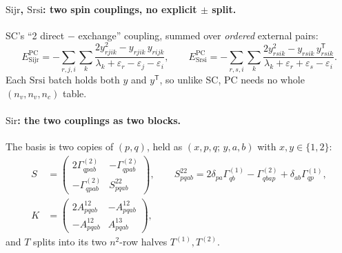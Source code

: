 \documentclass[11pt]{article}
\newcommand{\G}[1]{\Gamma^{(#1)}}
\newcommand{\eps}{\varepsilon}
\newcommand{\cls}[1]{\ensuremath{\mathrm{#1}}}
\begin{document}
\paragraph{\cls{Sijr}, \cls{Srsi}: two spin couplings, no explicit $\pm$
split.} SC's ``2 direct $-$ exchange'' coupling, summed over \emph{ordered}
external pairs:
\begin{equation}
  E^{\mathrm{PC}}_{\cls{Sijr}} = -\!\!\sum_{r,j,i}\sum_k
     \frac{2y_{rjik}^2 - y_{rjik}\,y_{rijk}}{\lambda_k + \eps_r - \eps_j - \eps_i},
  \qquad
  E^{\mathrm{PC}}_{\cls{Srsi}} = -\!\!\sum_{r,s,i}\sum_k
     \frac{2y_{rsik}^2 - y_{rsik}\,y^{\mathsf T}_{rsik}}{\lambda_k + \eps_r + \eps_s - \eps_i}.
  \label{eq:pc-coupled}
\end{equation}
Each \cls{Srsi} batch holds both $y$ and $y^{\mathsf T}$, so unlike SC, PC
needs no whole $(n_v,n_v,n_c)$ table.

\paragraph{\cls{Sir}: the two couplings as two blocks.} The basis is two
copies of $(p,q)$, held as $(x,p,q;\,y,a,b)$ with $x,y\in\{1,2\}$:
\begin{align}
  S &= \begin{pmatrix} 2\G2_{qpab} & -\G2_{qpab}\\ -\G2_{qpab} & S^{22}_{pqab}\end{pmatrix},
  \qquad
  S^{22}_{pqab} = 2\delta_{pa}\G1_{qb} - \G2_{qbap} + \delta_{ab}\G1_{qp},
  \label{eq:sir-S}\\
  K &= \begin{pmatrix} 2A^{12}_{pqab} & -A^{12}_{pqab}\\ -A^{12}_{pqab} & A^{13}_{pqab}\end{pmatrix},
  \label{eq:sir-K}
\end{align}
and $T$ splits into its two $n^2$-row halves $T^{(1)}, T^{(2)}$.
\end{document}
